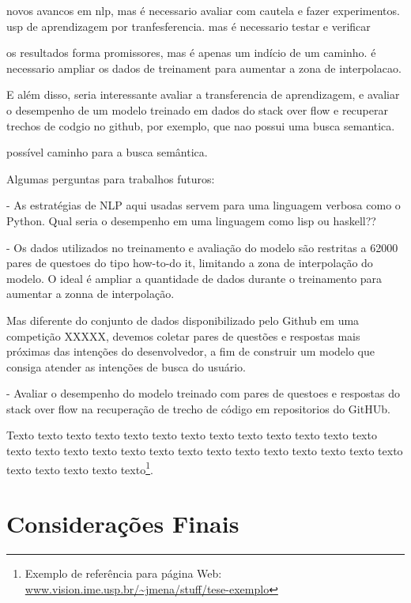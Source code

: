 novos avancos em nlp, mas é necessario avaliar com cautela e fazer experimentos. usp de aprendizagem por tranfesferencia. mas é necessario testar e verificar

os resultados forma promissores, mas é apenas um indício de um caminho. é necessario ampliar os dados de treinament para aumentar a zona de interpolacao. 

E além disso, seria interessante avaliar a transferencia de aprendizagem, e avaliar o desempenho de um modelo treinado em dados do stack over flow e recuperar trechos de codgio no github, por exemplo, que nao possui uma busca semantica.



possível caminho para a busca semântica.

Algumas perguntas para trabalhos futuros:

 - As estratégias de NLP aqui usadas servem para uma linguagem verbosa como o Python. Qual seria o desempenho em uma linguagem como lisp ou haskell??
 
 - Os dados utilizados no treinamento e avaliação do modelo são restritas a 62000 pares de questoes do tipo how-to-do it, limitando a zona de interpolação do modelo. O ideal é ampliar a quantidade de dados durante o treinamento para aumentar a zonna de interpolação. 
 
 
 Mas diferente do conjunto de dados disponibilizado pelo Github em uma competição XXXXX, devemos coletar pares de questões e respostas mais próximas das intenções do desenvolvedor, a fim de construir um modelo que consiga atender as intenções de busca do usuário.
 
 - Avaliar o desempenho do modelo treinado com pares de questoes e respostas do stack over flow na recuperação de trecho de código em repositorios do GitHUb. 


Texto texto texto texto texto texto texto texto texto texto texto texto texto
texto texto texto texto texto texto texto texto texto texto texto texto texto
texto texto texto texto texto texto\footnote{Exemplo de referência para página
Web: \url{www.vision.ime.usp.br/~jmena/stuff/tese-exemplo}}.

\section{Considerações Finais} 

